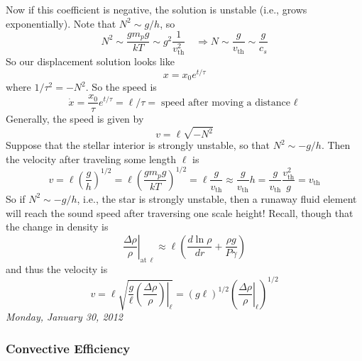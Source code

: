 \documentclass[10pt]{article}
\numberwithin{equation}{section}
\newcommand{\n}{\noindent}
\begin{document}
\n Now if this coefficient is negative, the solution is unstable
(i.e., grows exponentially). Note that $N^2\sim g/h$, so 
\begin{equation}
  \label{eq:30}
  N^2\sim\frac{gm_p
    g}{kT}\sim g^2\frac{1}{v_{\mathrm{th}}^2}\quad\Rightarrow N\sim \frac{g}{v_{\mathrm{th}}}\sim\frac{g}{c_s}
\end{equation}
So our displacement solution looks like
\begin{equation}
  \label{eq:31}
  x=x_0e^{t/\tau}
\end{equation}
where $1/\tau^2=-N^2$. So the speed is 
\begin{equation}
  \label{eq:32}
  \dot{x}=\frac{x_0}{\tau}e^{t/\tau}=\ell/\tau=\textrm{speed after
    moving a distance $\ell$}
\end{equation}
Generally, the speed is given by
\begin{equation}
  \label{eq:33}
  v=\ell\sqrt{-N^2}
\end{equation}
Suppose that the stellar interior is strongly unstable, so that
$N^2\sim-g/h$. Then the velocity after traveling some length $\ell$ is 
\begin{equation}
  \label{eq:34}
  v=\ell\left(\frac{g}{h}\right)^{1/2}=\ell\left(\frac{gm_pg}{kT}\right)^{1/2}=\ell\frac{g}{v_{\mathrm{th}}}\approx \frac{g}{v_{\mathrm{th}}}h=\frac{g}{v_{\mathrm{th}}}\frac{v_{\mathrm{th}}^2}{g}=v_{\mathrm{th}}
\end{equation}
So if $N^2\sim -g/h$, i.e., the star is strongly unstable, then a runaway
fluid element will reach the sound speed after traversing one scale
height! Recall, though that the change in density is
\begin{equation}
  \label{eq:35}
 \left. \frac{\Delta\rho}{\rho}\right|_{\mathrm{at\ \ell}}\approx
 \ell\left(\frac{d\ln \rho}{dr}+\frac{\rho g}{P\gamma}\right)
\end{equation}
and thus the velocity is
\begin{equation}
  \label{eq:36}
  v=\ell\sqrt{\left.\frac{g}{\ell}\left(\frac{\Delta
        \rho}{\rho}\right)\right|_{\ell}}=(g\ell)^{1/2}\left(\left.\frac{\Delta \rho}{\rho}\right|_{\ell}\right)^{1/2}
\end{equation}
\textit{Monday, January 30, 2012}\\

\subsubsection{Convective Efficiency}
\label{sec:conv-effic}
\end{document}
